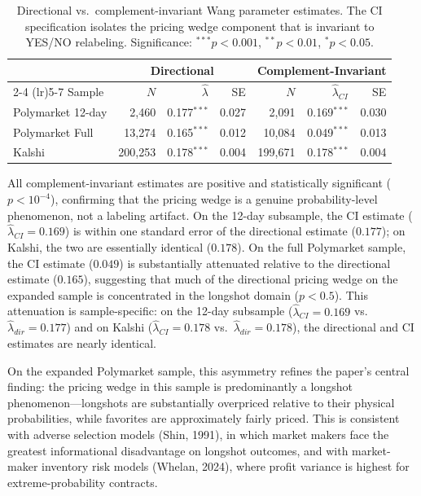 \documentclass[12pt,a4paper]{article}
\begin{document}
\begin{table}[H]
\centering
\small
\caption{Directional vs.\ complement-invariant Wang parameter estimates. The CI specification isolates the pricing wedge component that is invariant to YES/NO relabeling. Significance: $^{***}p<0.001$, $^{**}p<0.01$, $^{*}p<0.05$.}
\label{tab:ci_parallel}
\begin{tabular}{lrrrrrr}
\toprule
 & \multicolumn{3}{c}{Directional} & \multicolumn{3}{c}{Complement-Invariant} \\
\cmidrule(lr){2-4} \cmidrule(lr){5-7}
Sample & $N$ & $\hat{\lambda}$ & SE & $N$ & $\hat{\lambda}_{CI}$ & SE \\
\midrule
Polymarket 12-day & 2,460 & 0.177$^{***}$ & 0.027 & 2,091 & 0.169$^{***}$ & 0.030 \\
Polymarket Full & 13,274 & 0.165$^{***}$ & 0.012 & 10,084 & 0.049$^{***}$ & 0.013 \\
Kalshi & 200,253 & 0.178$^{***}$ & 0.004 & 199,671 & 0.178$^{***}$ & 0.004 \\
\bottomrule
\end{tabular}
\end{table}

All complement-invariant estimates are positive and statistically
significant (\(p < 10^{-4}\)), confirming that the pricing wedge is a
genuine probability-level phenomenon, not a labeling artifact. On the
12-day subsample, the CI estimate (\(\hat{\lambda}_{CI} = 0.169\)) is
within one standard error of the directional estimate (\(0.177\)); on
Kalshi, the two are essentially identical (\(0.178\)). On the full
Polymarket sample, the CI estimate (\(0.049\)) is substantially
attenuated relative to the directional estimate (\(0.165\)), suggesting
that much of the directional pricing wedge on the expanded sample is
concentrated in the longshot domain (\(p < 0.5\)). This attenuation is
sample-specific: on the 12-day subsample (\(\hat{\lambda}_{CI} = 0.169\)
vs.~\(\hat{\lambda}_{dir} = 0.177\)) and on Kalshi
(\(\hat{\lambda}_{CI} = 0.178\) vs.~\(\hat{\lambda}_{dir} = 0.178\)),
the directional and CI estimates are nearly identical.

On the expanded Polymarket sample, this asymmetry refines the paper's
central finding: the pricing wedge in this sample is predominantly a
longshot phenomenon---longshots are substantially overpriced relative to
their physical probabilities, while favorites are approximately fairly
priced. This is consistent with adverse selection models (Shin, 1991),
in which market makers face the greatest informational disadvantage on
longshot outcomes, and with market-maker inventory risk models (Whelan,
2024), where profit variance is highest for extreme-probability
contracts.
\end{document}
